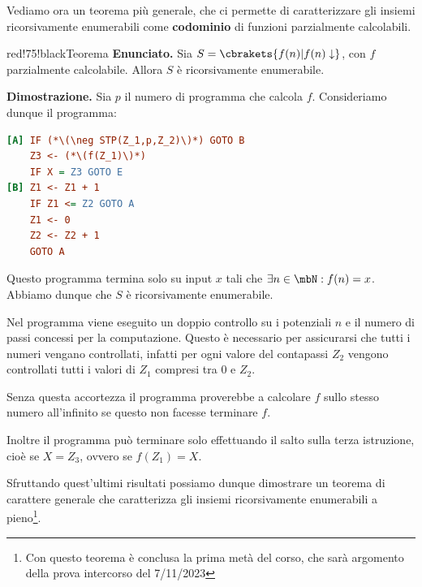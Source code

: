 Vediamo ora un teorema più generale, che ci permette di caratterizzare gli insiemi ricorsivamente enumerabili come \textbf{codominio} di funzioni parzialmente calcolabili.
\begin{halfframedbox}{red!75!black}{Teorema}
  \textbf{Enunciato. } Sia \(S = \cbrakets{f(n) \vert f(n) \downarrow}\), con \(f\) parzialmente calcolabile. Allora \(S\) è ricorsivamente enumerabile.
  \begin{center}
    \textcolor{red!75!black}{\hdashrule[0.5ex]{18cm}{1pt}{3mm 3pt 1mm 2pt}}
  \end{center}
  \textbf{Dimostrazione. } Sia \(p\) il numero di programma che calcola \(f\). Consideriamo dunque il programma:
  \begin{lstlisting}[language= ini, caption = { }, nolol]
[A] IF (*\(\neg STP(Z_1,p,Z_2)\)*) GOTO B
    Z3 <- (*\(f(Z_1)\)*)
    IF X = Z3 GOTO E
[B] Z1 <- Z1 + 1
    IF Z1 <= Z2 GOTO A
    Z1 <- 0
    Z2 <- Z2 + 1
    GOTO A
  \end{lstlisting}
  Questo programma termina solo su input \(x\) tali che \(\exists n \in \mbN: f(n)=x\). Abbiamo dunque che \(S\) è ricorsivamente enumerabile.

  Nel programma viene eseguito un doppio controllo su i potenziali \(n\) e il numero di passi concessi per la computazione. Questo è necessario per assicurarsi che tutti i numeri vengano controllati, infatti per ogni valore del contapassi \(Z_2\) vengono controllati tutti i valori di \(Z_1\) compresi tra \(0\) e \(Z_2\).

  Senza questa accortezza il programma proverebbe a calcolare \(f\) sullo stesso numero all'infinito se questo non facesse terminare \(f\).

  Inoltre il programma può terminare solo effettuando il salto sulla terza istruzione, cioè se \(X=Z_3\), ovvero se \(f(Z_1)=X\).
\end{halfframedbox}

Sfruttando quest'ultimi risultati possiamo dunque dimostrare un teorema di carattere generale che caratterizza gli insiemi ricorsivamente enumerabili a pieno\footnote{Con questo teorema è conclusa la prima metà del corso, che sarà argomento della prova intercorso del 7/11/2023}.

